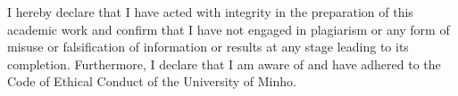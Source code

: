 I hereby declare that I have acted with integrity in the preparation of this academic work and confirm that I have not engaged in plagiarism or any form of misuse or falsification of information or results at any stage leading to its completion. Furthermore, I declare that I am aware of and have adhered to the Code of Ethical Conduct of the University of Minho.
\newpage